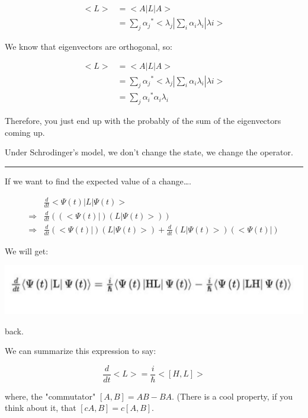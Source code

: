 \documentclass[letterpaper]{article}
\begin{document}
\begin{align}
   \big<L\big> &= \big<A | L | A\big> \\
&= \sum_j {\alpha_j}^* \big<\lambda_j|\sum_i \alpha_i \lambda_i | \lambda i \big>
\end{align}

We know that eigenvectors are orthogonal, so:

\begin{align}
   \big<L\big> &= \big<A | L | A\big> \\
&= \sum_j {\alpha_j}^* \big<\lambda_j|\sum_i \alpha_i \lambda_i | \lambda i \big>\\
&= \sum_j {\alpha_i}^* \alpha _i \lambda_i
\end{align}

Therefore, you just end up with the probably of the sum of the eigenvectors coming up.

Under Schrodinger's model, we don't change the state, we change the operator.

\noindent\rule{\textwidth}{0.5pt}

If we want to find the expected value of a change\ldots{}.

\begin{align}
   &\frac{d}{dt} \big <\Psi(t)|L|\Psi(t)\big>\\
\Rightarrow&\frac{d}{dt} ((\big <\Psi(t)|)(L|\Psi(t)\big>))\\
\Rightarrow&\frac{d}{dt} (\big <\Psi(t)|)(L|\Psi(t)\big>) + \frac{d}{dt} (L|\Psi(t)\big>)(\big <\Psi(t)|)
\end{align}

We will get:

\begin{center}
\includegraphics[width=.9\linewidth]{2022-03-04_09-28-18_screenshot.png}
\end{center}

back.

We can summarize this expression to say:

\begin{equation}
   \frac{d}{dt} \big<L\big> = \frac{i}{\hbar} \big<[H, L]\big>
\end{equation}

where, the "commutator" \([A,B] = AB-BA\). (There is a cool property, if you think about it, that \([cA,B] = c[A,B]\).
\end{document}
